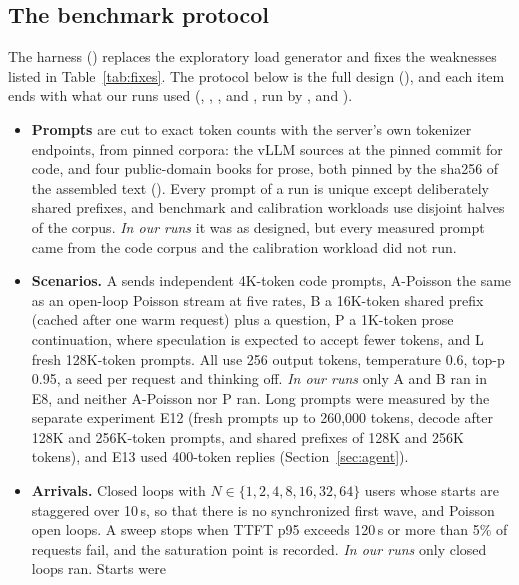 \subsection{The benchmark protocol}
The harness () replaces the exploratory load generator and fixes the weaknesses
listed in Table~\ref{tab:fixes}. The protocol below is the full design (),
and each item ends with what our runs used (, ,
,  and
, run by ,
 and ).
\begin{itemize}
\item \textbf{Prompts} are cut to exact token counts with the server's own tokenizer endpoints, from pinned corpora:
the vLLM sources at the pinned commit for code, and four public-domain books for prose, both pinned by the sha256 of
the assembled text (). Every prompt of a run is unique except deliberately shared
prefixes, and benchmark and calibration workloads use disjoint halves of the corpus. \emph{In our runs} it was as
designed, but every measured prompt came from the code corpus and the calibration workload did not run.
\item \textbf{Scenarios.} A sends independent 4K-token code prompts, A-Poisson the same as an open-loop Poisson stream
at five rates, B a 16K-token shared prefix (cached after one warm request) plus a question, P a 1K-token prose
continuation, where speculation is expected to accept fewer tokens, and L fresh 128K-token prompts. All use 256 output
tokens, temperature 0.6, top-p 0.95, a seed per request and thinking off. \emph{In our runs} only A and B ran in E8,
and neither A-Poisson nor P ran. Long prompts were measured by the separate experiment E12 (fresh prompts up to
260,000 tokens, decode after 128K and 256K-token prompts, and shared prefixes of 128K and 256K tokens), and E13 used
400-token replies (Section~\ref{sec:agent}).
\item \textbf{Arrivals.} Closed loops with $N\in\{1,2,4,8,16,32,64\}$ users whose starts are staggered over 10\,s, so
that there is no synchronized first wave, and Poisson open loops. A sweep stops when TTFT p95 exceeds 120\,s or more
than 5\% of requests fail, and the saturation point is recorded. \emph{In our runs} only closed loops ran. Starts were

\end{itemize}
